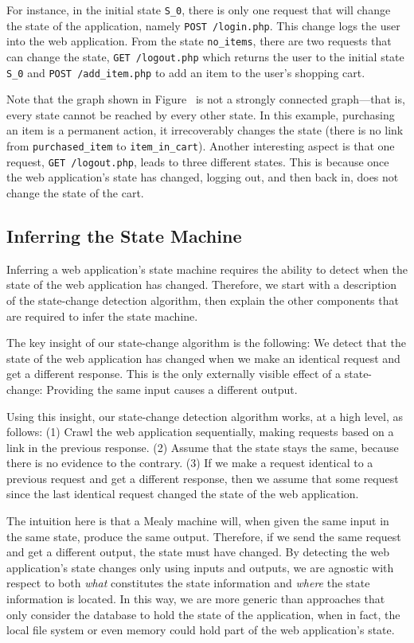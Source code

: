For instance, in the initial state \texttt{S\_0}, there is only one request that
will change the state of the application, namely \texttt{POST~/login.php}. This
change logs the user into the web application. From the state
\texttt{no\_items}, there are two requests that can change the state,
\texttt{GET~/logout.php} which returns the user to the initial state \texttt{S\_0} and
\texttt{POST~/add\_item.php} to add an item to the user's shopping cart.

Note that the graph shown in Figure~ is not a
strongly connected graph---that is, every state cannot be reached by every
other state. In this example, purchasing an item is a permanent action, it
irrecoverably changes the state (there is no link from
\texttt{purchased\_item} to \texttt{item\_in\_cart}). Another interesting
aspect is that one request, \texttt{GET~/logout.php}, leads to three different
states. This is because once the web application's state has changed, 
logging out, and then back in, does not change the state of the cart.

\subsection{Inferring the State Machine}

Inferring a web application's state machine requires the ability to detect when
the state of the web application has changed. Therefore, we start with a
description of the state-change detection algorithm, then explain the other
components that are required to infer the state machine. 

The key insight of our state-change algorithm is the following: We detect
that the state of the web application has changed when we make an identical
request and get a different response. This is the only externally visible
effect of a state-change: Providing the same input causes a different output.

Using this insight, our state-change detection algorithm works, at a high level,
as follows: (1) Crawl the web application sequentially, making requests based on
a link in the previous response. (2) Assume that the state stays the same,
because there is no evidence to the contrary. (3) If we make a request identical
to a previous request and get a different response, then we assume that some
request since the last identical request changed the state of the web
application.

The intuition here is that a Mealy machine will, when given the same input in
the same state, produce the same output. Therefore, if we send the same request
and get a different output, the state must have changed. By detecting the web
application's state changes only using inputs and outputs, we are agnostic with
respect to both \emph{what} constitutes the state information and \emph{where}
the state information is located. In this way, we are more generic than
approaches that only consider the database to hold the state of the
application, when in fact, the local file system or even memory could hold part
of the web application's state.

